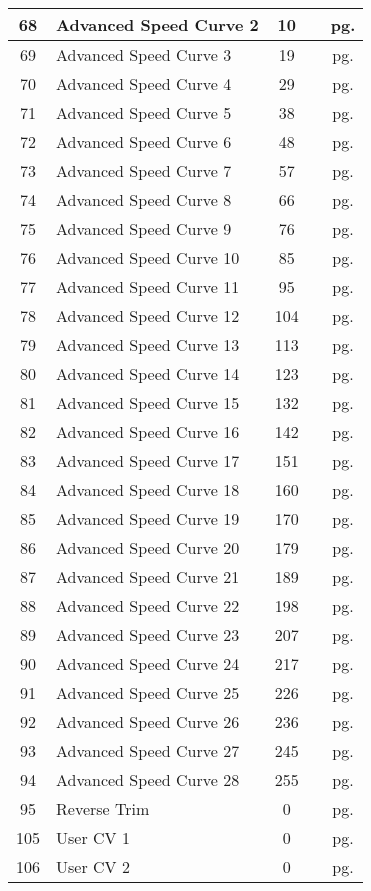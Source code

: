 \documentclass[12pt,letterpaper,draft]{memoir} %
\begin{document}
\begin{center}
\begin{longtable}{|c|l|c|c|c|}
68&Advanced Speed Curve 2&10&&pg. \pageref{CV68} \\ \hline
69&Advanced Speed Curve 3&19&&pg. \pageref{CV69} \\ \hline
70&Advanced Speed Curve 4&29&&pg. \pageref{CV70} \\ \hline
71&Advanced Speed Curve 5&38&&pg. \pageref{CV71} \\ \hline
72&Advanced Speed Curve 6&48&&pg. \pageref{CV72} \\ \hline
73&Advanced Speed Curve 7&57&&pg. \pageref{CV73} \\ \hline
74&Advanced Speed Curve 8&66&&pg. \pageref{CV74} \\ \hline
75&Advanced Speed Curve 9&76&&pg. \pageref{CV75} \\ \hline
76&Advanced Speed Curve 10&85&&pg. \pageref{CV76} \\ \hline
77&Advanced Speed Curve 11&95&&pg. \pageref{CV77} \\ \hline
78&Advanced Speed Curve 12&104&&pg. \pageref{CV78} \\ \hline
79&Advanced Speed Curve 13&113&&pg. \pageref{CV79} \\ \hline
80&Advanced Speed Curve 14&123&&pg. \pageref{CV80} \\ \hline
81&Advanced Speed Curve 15&132&&pg. \pageref{CV81} \\ \hline
82&Advanced Speed Curve 16&142&&pg. \pageref{CV82} \\ \hline
83&Advanced Speed Curve 17&151&&pg. \pageref{CV83} \\ \hline
84&Advanced Speed Curve 18&160&&pg. \pageref{CV84} \\ \hline
85&Advanced Speed Curve 19&170&&pg. \pageref{CV85} \\ \hline
86&Advanced Speed Curve 20&179&&pg. \pageref{CV86} \\ \hline
87&Advanced Speed Curve 21&189&&pg. \pageref{CV87} \\ \hline
88&Advanced Speed Curve 22&198&&pg. \pageref{CV88} \\ \hline
89&Advanced Speed Curve 23&207&&pg. \pageref{CV89} \\ \hline
90&Advanced Speed Curve 24&217&&pg. \pageref{CV90} \\ \hline
91&Advanced Speed Curve 25&226&&pg. \pageref{CV91} \\ \hline
92&Advanced Speed Curve 26&236&&pg. \pageref{CV92} \\ \hline
93&Advanced Speed Curve 27&245&&pg. \pageref{CV93} \\ \hline
94&Advanced Speed Curve 28&255&&pg. \pageref{CV94} \\ \hline
95&Reverse Trim&0&&pg. \pageref{CV95} \\ \hline
105&User CV 1&0&&pg. \pageref{CV105} \\ \hline
106&User CV 2&0&&pg. \pageref{CV106} \\ \hline
\end{longtable}
\end{center}
\end{document}
